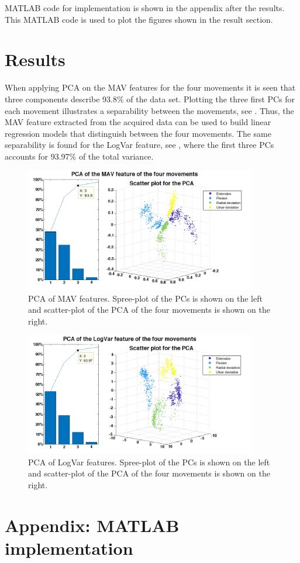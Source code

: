 MATLAB code for implementation is shown in the appendix after the results. This MATLAB code is used to plot the figures shown in the result section.

\section*{Results}

When applying PCA on the MAV features for the four movements it is seen that three components describe 93.8\% of the data set. Plotting the three first PCs for each movement illustrates a separability between the movements, see . Thus, the MAV feature extracted from the acquired data can be used to build linear regression models that distinguish between the four movements. The same separability is found for the LogVar feature, see , where the first three PCs accounts for 93.97\% of the total variance. 

\begin{figure}[H] 
	\includegraphics[width=0.9\textwidth]{figures/zASP/pcasubplotMAV}
	\caption{PCA of MAV features. Spree-plot of the PCs is shown on the left and scatter-plot of the PCA of the four movements is shown on the right.}
	\label{PCAMAV}
\end{figure}

\begin{figure}[H] 
	\includegraphics[width=0.9\textwidth]{figures/zASP/pcasubplotLogVar}
	\caption{PCA of LogVar features. Spree-plot of the PCs is shown on the left and scatter-plot of the PCA of the four movements is shown on the right.}
	\label{PCALogVar}
\end{figure}



\section*{Appendix: MATLAB implementation}



